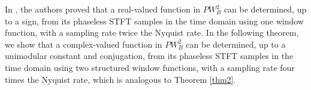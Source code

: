 \documentclass[12pt,oneside,reqno]{amsart}
\newtheorem{lemma}[theorem]{Lemma}%
\newcommand{\R}{\mathbb{R}}
\numberwithin{equation}{section}
\begin{document}





In \cite{alaifari2021uniqueness}, the authors proved that a real-valued function in $PW_B^2$ can be determined, up to a sign, from its phaseless STFT samples in the time domain using one window function, with a sampling rate twice the Nyquist rate.
In the following theorem, we show that a complex-valued function  in $PW_B^2$ can be determined, up to a unimodular constant and conjugation, from its phaseless STFT samples in the time domain using two structured window functions, with a sampling rate four times the Nyquist rate, which is analogous to Theorem \ref{thm2}.

\end{document}
